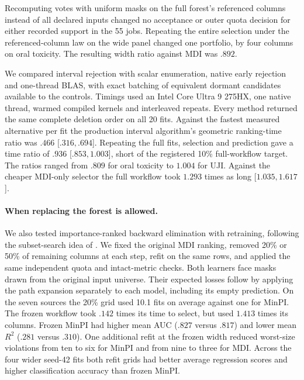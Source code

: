 Recomputing votes with uniform masks on the full forest's referenced
columns instead of all declared inputs changed no acceptance or outer
quota decision for either recorded support in the 55 jobs. Repeating the
entire selection under the referenced-column law on the wide panel changed
one portfolio, by four columns on oral toxicity. The resulting width ratio
against MDI was $.892$.

We compared interval rejection with scalar enumeration, native early
rejection and one-thread BLAS, with exact batching of equivalent dormant
candidates available to the controls. Timings used an Intel Core Ultra
9 275HX, one native thread, warmed compiled kernels and interleaved repeats.
Every method returned the same
complete deletion order on all 20 fits. Against the fastest measured
alternative per fit the production interval algorithm's geometric
ranking-time ratio was $.466$ [$ .316,.694$]. Repeating the full fits,
selection and prediction gave a time ratio of $.936$ [$ .853,1.003$],
short of the registered 10\% full-workflow target. The ratios ranged
from $.809$ for oral toxicity to $1.004$ for UJI. Against the cheaper
MDI-only selector the full workflow took $1.293$ times as long
[$1.035,1.617$].

\paragraph{When replacing the forest is allowed.}
We also tested importance-ranked backward elimination with retraining,
following the subset-search idea of \citet{diaz2006gene}. We fixed
the original MDI ranking, removed 20\% or 50\% of remaining columns
at each step, refit on the same rows, and applied the same independent
quota and intact-metric checks. Both learners face masks drawn from the
original input universe. Their expected losses follow by applying the
path expansion separately to each model, including its empty prediction.
On the seven sources the 20\% grid used 10.1 fits on average against one
for MinPI. The frozen workflow took $.142$ times its time to select,
but used $1.413$ times its columns. Frozen MinPI had higher mean AUC
($.827$ versus $.817$) and lower mean $R^2$ ($.281$ versus $.310$).
One additional refit at the frozen width reduced worst-size violations
from ten to six for MinPI and from nine to three for MDI. Across the four
wider seed-42 fits both refit grids had better average regression scores
and higher classification accuracy than frozen MinPI.

